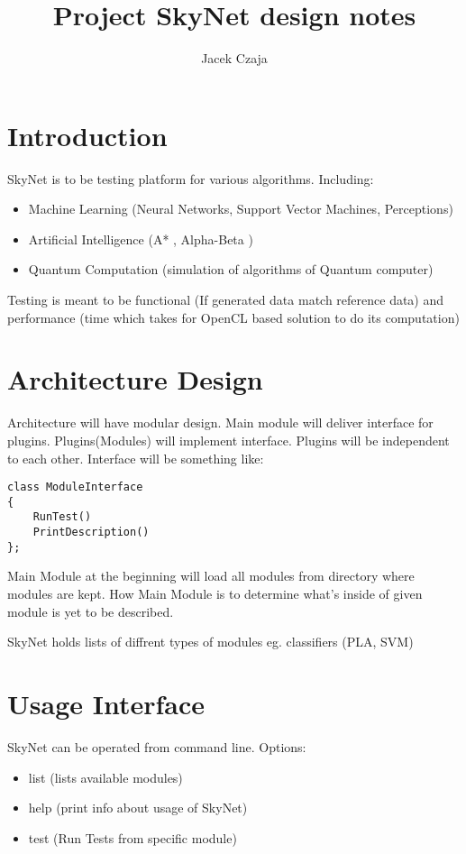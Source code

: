\documentclass[a4paper,10pt]{article}
\title{Project SkyNet design notes}
\author{Jacek Czaja}
\begin{document}
\maketitle

\tableofcontents

\section{Introduction}
SkyNet is to be testing platform for various algorithms. Including:
\begin{itemize}
\item Machine Learning (Neural Networks, Support Vector Machines, Perceptions)
\item Artificial Intelligence (A* , Alpha-Beta )
\item Quantum Computation (simulation of algorithms of Quantum computer)
\end{itemize}

Testing is meant to be functional (If generated data match reference data) and performance (time which takes for OpenCL based solution to do its computation)

\section{Architecture Design}
Architecture will have modular design.
Main module will deliver interface for plugins.
Plugins(Modules) will implement interface.
Plugins will be independent to each other.
Interface will be something like:
\begin{verbatim}
class ModuleInterface
{
    RunTest()
    PrintDescription()
};
\end{verbatim}

Main Module at the beginning will load all modules from directory where modules are kept.
How Main Module is to determine what's inside of given module is  yet to be described.

SkyNet holds lists of diffrent types of modules eg. classifiers (PLA, SVM)

\section{Usage Interface}
SkyNet can be operated from command line. Options:
\begin{itemize}
\item list (lists available modules)
\item help (print info about usage of SkyNet)
\item test (Run Tests from specific module)
\end{itemize}
\end{document}
